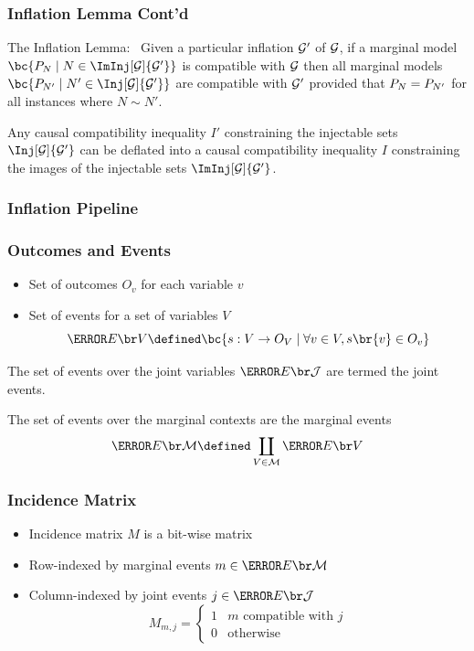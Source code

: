 \documentclass[
    hyperref={colorlinks=true, linkcolor=blue, urlcolor=blue, citecolor=MidnightBlue},
    xcolor={dvipsnames},
]{beamer}
\renewcommand{\term}[1]{\textcolor{Mahogany}{#1}}
\begin{document}
\begin{frame}
    \frametitle{Inflation Lemma Cont'd}
    \begin{lemma}
        \term{The Inflation Lemma:}~\cite[lemma 3]{Inflation} Given a particular inflation $\mathcal{G}'$ of $\mathcal{G}$, if a marginal model $\bc{\prob[N] \mid N \in \ImInj[\graph]{\graph'}}$ is compatible with $\mathcal{G}$ then all marginal models $\bc{\prob[N'] \mid N' \in \Inj[\graph]{\graph'}}$ are compatible with $\mathcal{G}'$ provided that $\prob[N] = \prob[N']$ for all instances where $N \sim N'$.
    \end{lemma}
    \begin{corollary}
        Any causal compatibility inequality $I'$ constraining the injectable sets $\Inj[\graph]{\graph'}$ can be \term{deflated} into a causal compatibility inequality $I$ constraining the images of the injectable sets $\ImInj[\graph]{\graph'}$.
    \end{corollary}
\end{frame}

\begin{frame}
    \frametitle{Inflation Pipeline}
\end{frame}

\begin{frame}
    \frametitle{Outcomes and Events}
    \begin{itemize}
        \item Set of \term{outcomes} $O_v$ for each variable $v$
        \item Set of \term{events} for a set of variables $V$
        \[ \Events{V} \defined \bc{s: V \to O_V \mid \forall v \in V, s\br{v} \in O_v} \]
    \end{itemize}
    \begin{definition}
        The set of events over the joint variables $\Events{\jointvar}$ are termed the \term{joint events}.
    \end{definition}
    \begin{definition}
        The set of events over the marginal contexts are the \term{marginal events}
        \[ \Events{\mscenario} \defined \coprod_{V \in \mscenario} \Events{V} \]
    \end{definition}
\end{frame}


\begin{frame}
    \frametitle{Incidence Matrix}
    \begin{itemize}
        \item Incidence matrix $M$ is a bit-wise matrix
        \item Row-indexed by marginal events $m \in \Events{\mscenario}$
        \item Column-indexed by joint events $j \in \Events{\jointvar}$
        \[ M_{m,j} = \begin{cases}
            1 & m \text{ compatible with } j \\
            0 & \text{otherwise}
        \end{cases} \]
    \end{itemize}
\end{frame}
\end{document}
